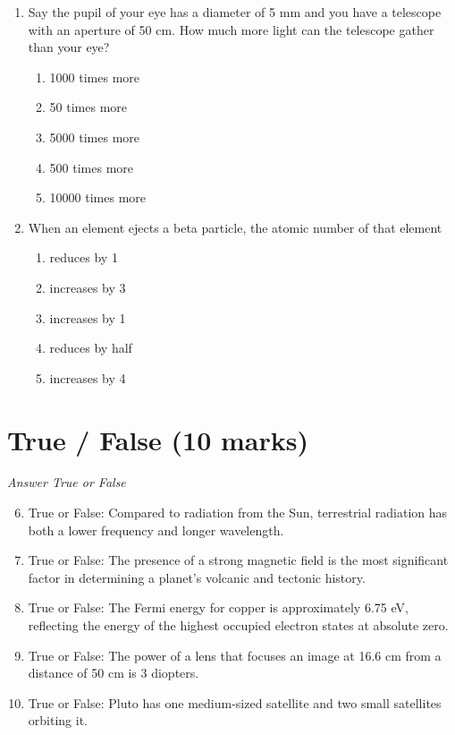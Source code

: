 \documentclass[12pt]{article}
\begin{document}
\begin{enumerate}[label=\arabic*.]
\begin{enumerate}[label=(\alph*)]
    \item Velocity, height, and acceleration
    \item Velocity and acceleration
\end{enumerate}
\item Say the pupil of your eye has a diameter of 5 mm and you have a telescope with an aperture of 50 cm. How much more light can the telescope gather than your eye?
\begin{enumerate}[label=(\alph*)]
    \item 1000 times more
    \item 50 times more
    \item 5000 times more
    \item 500 times more
    \item 10000 times more
\end{enumerate}
\item When an element ejects a beta particle, the atomic number of that element
\begin{enumerate}[label=(\alph*)]
    \item reduces by 1
    \item increases by 3
    \item increases by 1
    \item reduces by half
    \item increases by 4
\end{enumerate}
\end{enumerate}

\section*{True / False (10 marks)}
\textit{Answer True or False}
\begin{enumerate}[label=\arabic*.]
\setcounter{enumi}{5}
\item True or False: Compared to radiation from the Sun, terrestrial radiation has both a lower frequency and longer wavelength.
\item True or False: The presence of a strong magnetic field is the most significant factor in determining a planet's volcanic and tectonic history.
\item True or False: The Fermi energy for copper is approximately 6.75 eV, reflecting the energy of the highest occupied electron states at absolute zero.
\item True or False: The power of a lens that focuses an image at 16.6 cm from a distance of 50 cm is 3 diopters.
\item True or False: Pluto has one medium-sized satellite and two small satellites orbiting it.
\end{enumerate}
\end{document}
